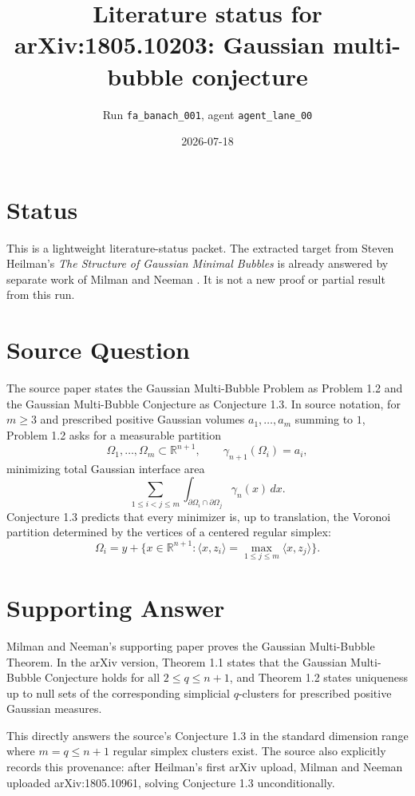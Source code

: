 \documentclass[11pt]{article}
\title{Literature status for arXiv:1805.10203: Gaussian multi-bubble conjecture}
\author{Run \texttt{fa\_banach\_001}, agent \texttt{agent\_lane\_00}}
\date{2026-07-18}
\newcommand{\R}{\mathbb R}
\begin{document}
\maketitle

\section*{Status}

This is a lightweight literature-status packet.  The extracted target from
Steven Heilman's \emph{The Structure of Gaussian Minimal Bubbles}
\cite{Heilman2018} is already answered by separate work of Milman and Neeman
\cite{MilmanNeeman2018,MilmanNeeman2022}.  It is not a new proof or partial
result from this run.

\section*{Source Question}

The source paper states the Gaussian Multi-Bubble Problem as Problem 1.2 and
the Gaussian Multi-Bubble Conjecture as Conjecture 1.3.  In source notation,
for \(m\ge3\) and prescribed positive Gaussian volumes
\(a_1,\ldots,a_m\) summing to \(1\), Problem 1.2 asks for a measurable
partition
\[
    \Omega_1,\ldots,\Omega_m\subset\R^{n+1},
    \qquad \gamma_{n+1}(\Omega_i)=a_i,
\]
minimizing total Gaussian interface area
\[
    \sum_{1\le i<j\le m}
    \int_{\partial\Omega_i\cap\partial\Omega_j}\gamma_n(x)\,dx .
\]
Conjecture 1.3 predicts that every minimizer is, up to translation, the
Voronoi partition determined by the vertices of a centered regular simplex:
\[
    \Omega_i
    =
    y+\{x\in\R^{n+1}:\langle x,z_i\rangle
       =\max_{1\le j\le m}\langle x,z_j\rangle\}.
\]

\section*{Supporting Answer}

Milman and Neeman's supporting paper proves the Gaussian Multi-Bubble
Theorem.  In the arXiv version, Theorem 1.1 states that the Gaussian
Multi-Bubble Conjecture holds for all \(2\le q\le n+1\), and Theorem 1.2
states uniqueness up to null sets of the corresponding simplicial
\(q\)-clusters for prescribed positive Gaussian measures.

This directly answers the source's Conjecture 1.3 in the standard dimension
range where \(m=q\le n+1\) regular simplex clusters exist.  The source also
explicitly records this provenance: after Heilman's first arXiv upload,
Milman and Neeman uploaded arXiv:1805.10961, solving Conjecture 1.3
unconditionally.
\end{document}
